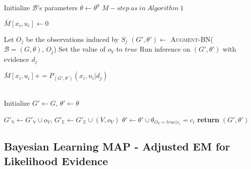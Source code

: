 \documentclass[11pt]{article}
\begin{document}
\begin{article}
\begin{algorithm*}[h!]
\begin{multicols}{2}
\begin{algorithmic}[1]
\State Initialize $\mathcal{B}$'s parameters $\theta \leftarrow \theta^0$
  \State $M-step \ as \ in \ Algorithm \ 1$
\EndFor
\EndProcedure
\\

   \State $\bar{M}[x_{i},u_{i}]\leftarrow 0$
  \EndFor
\EndFor


    \State Let $O_j$ be the observations induced by $S_j$
    \State $(G',\theta') \leftarrow$ \textsc{Augment-BN}($\mathcal{B}=(G,\theta)$, $O_{j}$)
      \State Set the value of $o_V$ to $true$
    \EndFor
    \State Run inference on $(G',\theta')$ with evidence $d_{j}$
    
        \State $\bar{M}[x_{i},u_{i}] \mathrel{{+}{=}} P_{(G',\theta')}(x_{i},u_{i}|d_{j})$
    
      \EndFor
    \EndFor
\EndFor
\EndFunction
\\
  \State Initialize $G'\leftarrow G$, $\theta'\leftarrow\theta$

    \State $G'_{\mathbb{V}}\leftarrow G'_{\mathbb{V}}\cup o_{V}$, $G'_{\mathbb{E}}\leftarrow G'_{\mathbb{E}}\cup(V,o_{V})$      
       
      \State $\theta'\leftarrow\theta'\cup\theta_{O_{V}=true|v_{i}}=c_{i}$ 
    \EndFor
  \EndFor
\State \textbf{return} $(G',\theta')$
\end{algorithmic}
\end{multicols}
\end{algorithm*}

\newpage

\subsection{Bayesian Learning MAP - Adjusted EM for Likelihood Evidence}
\label{sec:org08b2b97}


\end{article}
\end{document}
